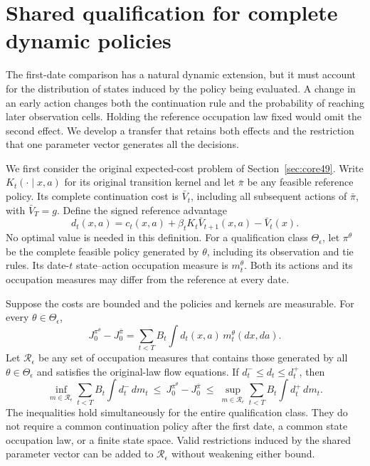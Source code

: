 \section{Shared qualification for complete dynamic policies}\label{sec:recursive86}
The first-date comparison has a natural dynamic extension, but it must account for the distribution of states induced by the policy being evaluated. A change in an early action changes both the continuation rule and the probability of reaching later observation cells. Holding the reference occupation law fixed would omit the second effect. We develop a transfer that retains both effects and the restriction that one parameter vector generates all the decisions.

We first consider the original expected-cost problem of Section~\ref{sec:core49}. Write $K_t(\cdot\mid x,a)$ for its original transition kernel and let $\bar\pi$ be any feasible reference policy. Its complete continuation cost is $\bar V_t$, including all subsequent actions of $\bar\pi$, with $\bar V_T=g$. Define the signed reference advantage
\begin{equation}\label{eq:advantage86}
 d_t(x,a)=c_t(x,a)+\beta_t K_t\bar V_{t+1}(x,a)-\bar V_t(x).
\end{equation}
No optimal value is needed in this definition. For a qualification class $\Theta_\epsilon$, let $\pi^\theta$ be the complete feasible policy generated by $\theta$, including its observation and tie rules. Its date-$t$ state--action occupation measure is $m_t^\theta$. Both its actions and its occupation measures may differ from the reference at every date.

\begin{theorem}\label{thm:dynamic86}
Suppose the costs are bounded and the policies and kernels are measurable. For every $\theta\in\Theta_\epsilon$,
\begin{equation}\label{eq:occupation86}
 J_0^{\pi^\theta}-J_0^{\bar\pi}
 =\sum_{t<T}B_t\int d_t(x,a)\,m_t^\theta(dx,da).
\end{equation}
Let $\mathcal R_\epsilon$ be any set of occupation measures that contains those generated by all $\theta\in\Theta_\epsilon$ and satisfies the original-law flow equations. If $d_t^-\le d_t\le d_t^+$, then
\begin{equation}\label{eq:dynamic-bands86}
 \inf_{m\in\mathcal R_\epsilon}\sum_{t<T}B_t\int d_t^-\,dm_t
 \ \le\ J_0^{\pi^\theta}-J_0^{\bar\pi}\ \le\
 \sup_{m\in\mathcal R_\epsilon}\sum_{t<T}B_t\int d_t^+\,dm_t.
\end{equation}
The inequalities hold simultaneously for the entire qualification class. They do not require a common continuation policy after the first date, a common state occupation law, or a finite state space. Valid restrictions induced by the shared parameter vector can be added to $\mathcal R_\epsilon$ without weakening either bound.
\end{theorem}

